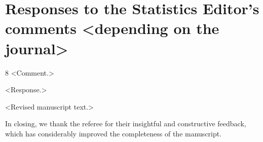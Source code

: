 \documentclass[11pt]{article}
\begin{document}
\section*{Responses to the Statistics Editor's comments <depending on the journal>}
\begin{refereecomment}{8}
  <Comment.>
\end{refereecomment}
\begin{authorresponse}
  <Response.>

  \begin{manuscriptchange}
    <Revised manuscript text.>
  \end{manuscriptchange}
\end{authorresponse}

In closing, we thank the referee for their insightful and constructive feedback, which has considerably improved the completeness of the manuscript.

% 
% 
\end{document}
